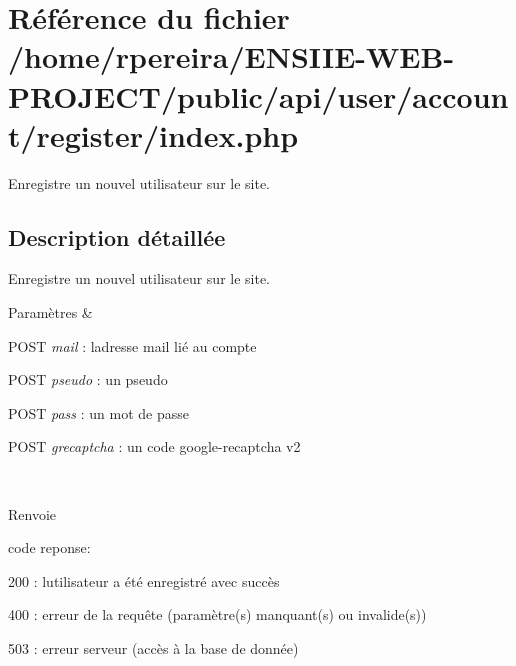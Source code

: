 \hypertarget{account_2register_2index_8php}{}\section{Référence du fichier /home/rpereira/\+E\+N\+S\+I\+I\+E-\/\+W\+E\+B-\/\+P\+R\+O\+J\+E\+C\+T/public/api/user/account/register/index.php}
\label{account_2register_2index_8php}


Enregistre un nouvel utilisateur sur le site.  




\subsection{Description détaillée}
Enregistre un nouvel utilisateur sur le site. 


\begin{DoxyParams}{Paramètres}
{\em } & 
\begin{DoxyItemize}
\item P\+O\+ST {\itshape mail} \+: l\textquotesingle{}adresse mail lié au compte
\item P\+O\+ST {\itshape pseudo} \+: un pseudo
\item P\+O\+ST {\itshape pass} \+: un mot de passe
\item P\+O\+ST {\itshape grecaptcha} \+: un code google-\/recaptcha v2 
\end{DoxyItemize}\\
\hline
\end{DoxyParams}
\begin{DoxyReturn}{Renvoie}

\begin{DoxyItemize}
\item code reponse\+:
\begin{DoxyItemize}
\item 200 \+: l\textquotesingle{}utilisateur a été enregistré avec succès
\item 400 \+: erreur de la requête (paramètre(s) manquant(s) ou invalide(s))
\item 503 \+: erreur serveur (accès à la base de donnée) 
\end{DoxyItemize}
\end{DoxyItemize}
\end{DoxyReturn}
